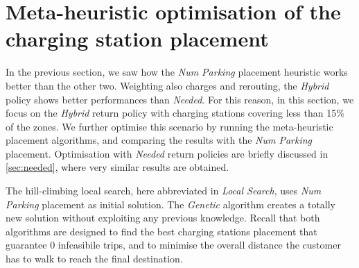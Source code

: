 \section{Meta-heuristic optimisation of the charging station placement}
\label{sec:7_7a_opt}



In the previous section, we saw how the \textit{Num Parking} placement heuristic works better than the other two.
Weighting also charges and rerouting, the \textit{Hybrid} policy shows better performances than \textit{Needed}. For this reason, in this section, we focus on the \textit{Hybrid} return policy with charging stations covering less than 15\% of the zones. We further optimise this scenario by running the meta-heuristic placement algorithms, and comparing the results with the \textit{Num Parking} placement. 
Optimisation with \textit{Needed} return policies are briefly discussed in \ref{sec:needed}, where very similar results are obtained.  

The hill-climbing local search, here abbreviated in \textit{Local Search}, uses \textit{Num Parking} placement as initial solution. The \textit{Genetic} algorithm creates a totally new solution without exploiting any previous knowledge. 
Recall that both algorithms are designed to find the best charging stations placement that guarantee 0 infeasibile trips, and to minimise the overall distance the customer has to walk to reach the final destination.


